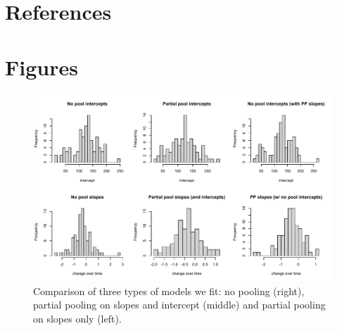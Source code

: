 \documentclass[11pt]{article}
\begin{document}
\section{References}
\vspace{-5ex}


\clearpage
\section{Figures}

\begin{figure}[ht]
\centering
\noindent \includegraphics[width=1\textwidth]{examples/synchrony/graphs/compareppmodels.pdf}
\caption{Comparison of three types of models we fit: no pooling (right), partial pooling on slopes and intercept (middle) and partial pooling on slopes only (left).}
\label{fig:ppmodels}
\end{figure}
\end{document}
